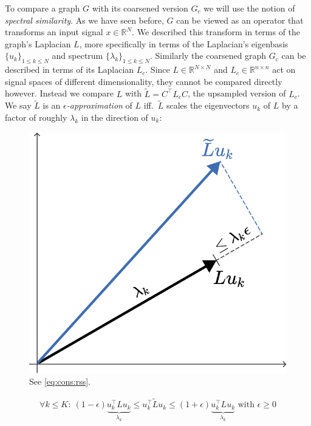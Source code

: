 To compare a graph $G$ with its coarsened version $G_c$ we will use the notion of \textit{spectral similarity}.
As we have seen before, $G$ can be viewed as an operator that transforms an input signal $x \in \mathbb{R}^N$.
We described this transform in terms of the graph's Laplacian $L$,
more specifically in terms of the Laplacian's eigenbasis ${\{ u_k \}}_{1 \leq k \leq N}$ and spectrum ${\{ \lambda_k \}}_{1 \leq k \leq N}$.
Similarly the coarsened graph $G_c$ can be described in terms of its Laplacian $L_c$.
Since $L \in \mathbb{R}^{N \times N}$ and $L_c \in \mathbb{R}^{n \times n}$ act on signal spaces of different dimensionality, they cannot be compared directly however.
Instead we compare $L$ with $\widetilde{L} = C^{\top} L_c C$, the upsampled version of $L_c$.
We say $\widetilde{L}$ is an \textit{$\epsilon$-approximation} of $L$ iff.\  $\widetilde{L}$ scales the eigenvectors $u_k$ of $L$ by a factor of roughly $\lambda_k$ in the direction of $u_k$:
\begin{figure}
	\centering
	\includegraphics[width=\linewidth]{gfx/cons/rss.pdf}
	\caption{See \cref{eq:cons:rss}.}\label{fig:cons:rss}
\end{figure}
\begin{align}
	\forall k \leq K:\ (1 - \epsilon) \underbrace{u_k^{\top} L u_k}_{\lambda_k} \leq u_k^{\top} \widetilde{L} u_k \leq (1 + \epsilon) \underbrace{u_k^{\top} L u_k}_{\lambda_k} \text{ with } \epsilon \geq 0\label{eq:cons:rss}
\end{align}
